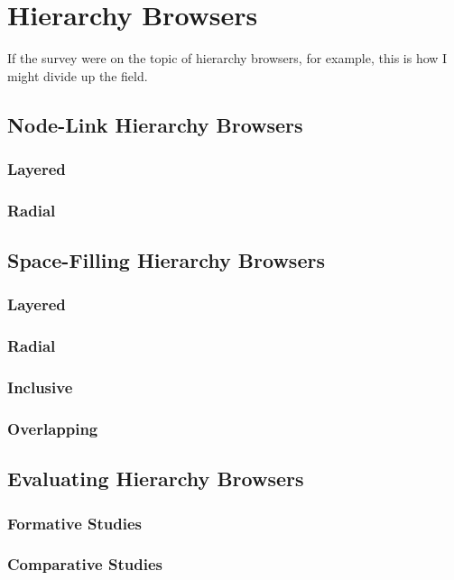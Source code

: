 %
%
% 
% 
% 


\chapter{Hierarchy Browsers}

\label{chap:Browsers}


If the survey were on the topic of hierarchy browsers, for example,
this is how I might divide up the field.



\section{Node-Link Hierarchy Browsers}

\subsection{Layered}

\subsection{Radial}





\section{Space-Filling Hierarchy Browsers}

\subsection{Layered}

\subsection{Radial}

\subsection{Inclusive}

\subsection{Overlapping}






\section{Evaluating Hierarchy Browsers}

\subsection{Formative Studies}

\subsection{Comparative Studies}


